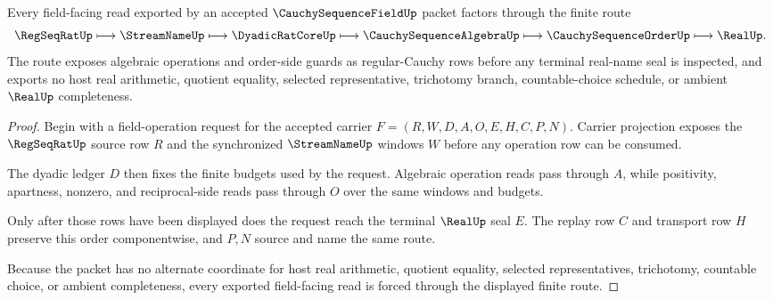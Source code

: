 \begin{theorem}
\label{thm:cauchy-sequence-field-operation-route}
Every field-facing read exported by an accepted $\CauchySequenceFieldUp$ packet factors through the finite route
$$
\RegSeqRatUp \longmapsto \StreamNameUp \longmapsto \DyadicRatCoreUp \longmapsto
\CauchySequenceAlgebraUp \longmapsto \CauchySequenceOrderUp \longmapsto \RealUp .
$$
The route exposes algebraic operations and order-side guards as regular-Cauchy rows before any terminal real-name seal is inspected, and exports no host real arithmetic, quotient equality, selected representative, trichotomy branch, countable-choice schedule, or ambient $\RealUp$ completeness.
\end{theorem}
\begin{proof}
Begin with a field-operation request for the accepted carrier $F=(R,W,D,A,O,E,H,C,P,N)$. Carrier projection exposes the $\RegSeqRatUp$ source row $R$ and the synchronized $\StreamNameUp$ windows $W$ before any operation row can be consumed.

The dyadic ledger $D$ then fixes the finite budgets used by the request. Algebraic operation reads pass through $A$, while positivity, apartness, nonzero, and reciprocal-side reads pass through $O$ over the same windows and budgets.

Only after those rows have been displayed does the request reach the terminal $\RealUp$ seal $E$. The replay row $C$ and transport row $H$ preserve this order componentwise, and $P,N$ source and name the same route.

Because the packet has no alternate coordinate for host real arithmetic, quotient equality, selected representatives, trichotomy, countable choice, or ambient completeness, every exported field-facing read is forced through the displayed finite route.
\end{proof}


